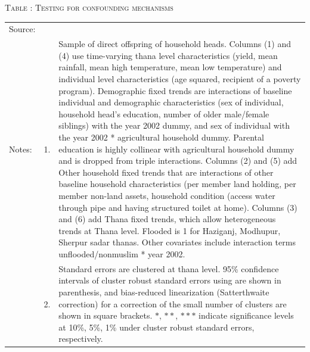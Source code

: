 \documentclass[12pt,letterpaper]{article}
\newcommand{\0}{\ensuremath{\mbox{\boldmath $0$}}}
\begin{document}
\begin{table}
\hfil\textsc{\footnotesize Table \thetable: Testing for confounding mechanisms \label{FloodNonMuslimResults}}\\
\setlength{\tabcolsep}{1pt}
\renewcommand{\arraystretch}{.75}
\hfil

\renewcommand{\arraystretch}{1}
\hfil\begin{tabular}{>{\hfill\scriptsize}p{1cm}<{}>{\hfill\scriptsize}p{.25cm}<{}>{\scriptsize}p{.7\paperwidth}<{\hfill}}
Source:& \multicolumn{2}{l}{\scriptsize Compiled from IFPRI data. }\\[-1ex]
Notes:& 1. & Sample of direct offspring of household heads. Columns \textsf{(1) and (4)} use time-varying thana level characteristics (yield, mean rainfall, mean high temperature, mean low temperature) and individual level characteristics (age squared, recipient of a poverty program). \textsf{Demographic fixed trends} are interactions of baseline individual and demographic characteristics (sex of individual, household head's education, number of older male/female siblings) with the year 2002 dummy, and sex of individual with the year 2002 * agricultural household dummy. Parental education is highly collinear with agricultural household dummy and is dropped from triple interactions. Columns \textsf{(2) and (5)} add \textsf{Other household fixed trends} that are interactions of other baseline household characteristics (per member land holding, per member non-land assets, household condition (access water through pipe and having structured toilet at home). Columns \textsf{(3) and (6)} add \textsf{Thana fixed trends}, which allow heterogeneous trends at Thana level.  \textsf{Flooded} is 1 for Haziganj, Modhupur, Sherpur sadar thanas. Other covariates include interaction terms \textsf{unflooded/nonmuslim * year 2002}. \\[-1ex]
& 2. & Standard errors are clustered at thana level. 95\% confidence intervals of cluster robust standard errors using \cite{liang1986longitudinal} are shown in parenthesis, and bias-reduced linearization (Satterthwaite correction) for a correction of the small number of clusters are shown in square brackets. $*$, $**$, $***$ indicate significance levels at 10\%, 5\%, 1\% under cluster robust standard errors, respectively. 
\end{tabular}
\end{table}
\end{document}
